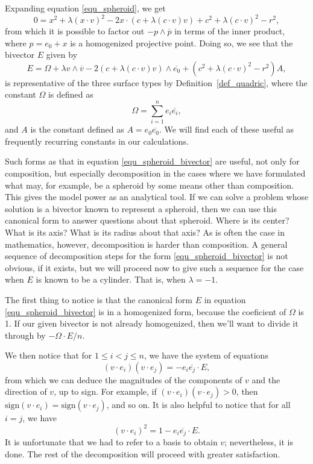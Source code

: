 \documentclass{ecgd-l}
\theoremstyle{definition}
\theoremstyle{remark}
\numberwithin{equation}{section}
\begin{document}
Expanding equation \eqref{equ_spheroid}, we get
\begin{equation}
0 = x^2 + \lambda(x\cdot v)^2 - 2x\cdot (c+\lambda(c\cdot v)v) + c^2 + \lambda(c\cdot v)^2 - r^2,
\end{equation}
from which it is possible to factor out $-p\wedge\overline{p}$
in terms of the inner product, where $p=e_0+x$
is a homogenized projective point.  Doing so, we see that the bivector
$E$ given by
\begin{equation}\label{equ_spheroid_bivector}
E = \Omega + \lambda v\wedge\overline{v} - 2(c+\lambda(c\cdot v)v)\wedge\overline{e_0} + (c^2+\lambda(c\cdot v)^2-r^2)A,
\end{equation}
is representative of the three surface types by Definition~\ref{def_quadric}, where the constant
$\Omega$ is defined as
\begin{equation}
\Omega=\sum_{i=1}^n e_i\overline{e_i},
\end{equation}
and $A$ is the constant defined as $A=e_0\overline{e_0}$.  We will find each of these useful as
frequently recurring constants in our calculations.

Such forms as that in equation \eqref{equ_spheroid_bivector} are useful, not only
for composition, but especially decomposition in the cases
where we have formulated what may, for example, be a spheroid by some means
other than composition.
This gives the model power as an analytical tool.  If we can solve a problem whose solution
is a bivector known to represent a spheroid, then we can use this canonical form to answer
questions about that spheroid.  Where is its center?  What is its axis?  What is its radius
about that axis?  As is often the case in mathematics, however, decomposition is
harder than composition.  A general sequence of decomposition steps for the
form \eqref{equ_spheroid_bivector} is not obvious, if it exists, but we will
proceed now to give such a sequence for the case when $E$ is known
to be a cylinder.  That is, when $\lambda=-1$.

The first thing to notice is that the canonical form $E$ in equation \eqref{equ_spheroid_bivector}
is in a homogenized form, because the coeficient of $\Omega$ is 1.  If our given bivector
is not already homogenized, then we'll want to divide it through by $-\Omega\cdot E/n$.

We then notice that for $1\leq i<j\leq n$, we have the system of equations
\begin{equation}
(v\cdot e_i)(v\cdot e_j) = -e_i\overline{e_j}\cdot E,
\end{equation}
from which we can deduce the magnitudes of the components of $v$ and the
direction of $v$, up to sign.  For example, if $(v\cdot e_i)(v\cdot e_j)>0$,
then $\mbox{sign}(v\cdot e_i)=\mbox{sign}(v\cdot e_j)$, and so on.
It is also helpful to notice that for all $i=j$, we have
\begin{equation}
(v\cdot e_i)^2 = 1 - e_i\overline{e_j}\cdot E.
\end{equation}
It is unfortunate that we had to refer to a basis to obtain $v$; nevertheless,
it is done.  The rest of the decomposition will proceed with greater satisfaction.
\end{document}
